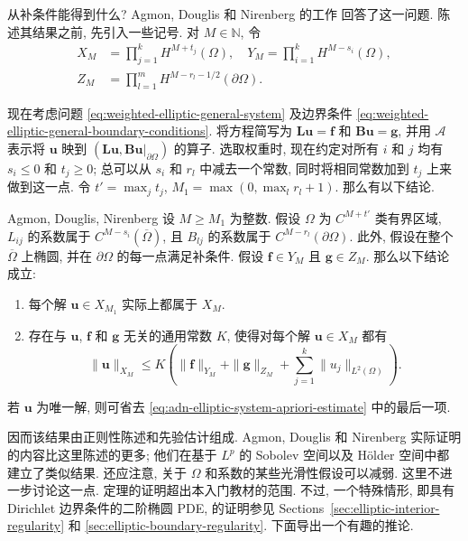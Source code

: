 从补条件能得到什么? Agmon, Douglis 和 Nirenberg 的工作 \cite{ADN2} 回答了这一问题. 陈述其结果之前, 先引入一些记号. 对 $M\in\mathbb{N}$, 令
\begin{equation}\label{eq:adn-weighted-sobolev-domain-data-spaces}
\begin{aligned}
X_M&=\prod_{j=1}^kH^{M+t_j}(\Omega),\quad Y_M=\prod_{i=1}^kH^{M-s_i}(\Omega),\\
Z_M&=\prod_{l=1}^mH^{M-r_l-1/2}(\partial\Omega).
\end{aligned}
\end{equation}


现在考虑问题 \eqref{eq:weighted-elliptic-general-system} 及边界条件 \eqref{eq:weighted-elliptic-general-boundary-conditions}. 将方程简写为 $\bm{L}\bm{u}=\bm{f}$ 和 $\bm{B}\bm{u}=\bm{g}$, 并用 $\mathcal{A}$ 表示将 $\bm{u}$ 映到 $(\bm{L}\bm{u},\bm{B}\bm{u}|_{\partial\Omega})$ 的算子. 选取权重时, 现在约定对所有 $i$ 和 $j$ 均有 $s_i\leq0$ 和 $t_j\geq0$; 总可以从 $s_i$ 和 $r_l$ 中减去一个常数, 同时将相同常数加到 $t_j$ 上来做到这一点. 令 $t\prime=\max_jt_j$, $M_1=\max(0,\max_lr_l+1)$. 那么有以下结论.

\begin{Theorem}{Agmon, Douglis, Nirenberg}
\label{thm:agmon-douglis-nirenberg-elliptic-estimate}
设 $M\geq M_1$ 为整数. 假设 $\Omega$ 为 $C^{M+t\prime}$ 类有界区域, $L_{ij}$ 的系数属于 $C^{M-s_i}(\overline\Omega)$, 且 $B_{lj}$ 的系数属于 $C^{M-r_l}(\partial\Omega)$. 此外, 假设在整个 $\overline\Omega$ 上椭圆, 并在 $\partial\Omega$ 的每一点满足补条件. 假设 $\bm{f}\in Y_M$ 且 $\bm{g}\in Z_M$. 那么以下结论成立:\begin{enumerate}\item 每个解 $\bm{u}\in X_{M_1}$ 实际上都属于 $X_M$.\item 存在与 $\bm{u}$, $\bm{f}$ 和 $\bm{g}$ 无关的通用常数 $K$, 使得对每个解 $\bm{u}\in X_M$ 都有
\begin{equation}\label{eq:adn-elliptic-system-apriori-estimate}
\|\bm{u}\|_{X_M}\leq K\left(\|\bm{f}\|_{Y_M}+\|\bm{g}\|_{Z_M}+\sum_{j=1}^k\|u_j\|_{L^2(\Omega)}\right).
\end{equation}
\end{enumerate}若 $\bm{u}$ 为唯一解, 则可省去 \eqref{eq:adn-elliptic-system-apriori-estimate} 中的最后一项.
\end{Theorem}

因而该结果由正则性陈述和先验估计组成. Agmon, Douglis 和 Nirenberg 实际证明的内容比这里陈述的更多; 他们在基于 $L^p$ 的 Sobolev 空间以及 Hölder 空间中都建立了类似结果. 还应注意, 关于 $\Omega$ 和系数的某些光滑性假设可以减弱. 这里不进一步讨论这一点. 定理的证明超出本入门教材的范围. 不过, 一个特殊情形, 即具有 Dirichlet 边界条件的二阶椭圆 PDE, 的证明参见 Sections~\ref{sec:elliptic-interior-regularity} 和 \ref{sec:elliptic-boundary-regularity}. 下面导出一个有趣的推论.

